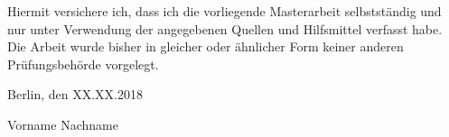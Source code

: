 
Hiermit versichere ich, dass ich die vorliegende Masterarbeit selbstständig und nur unter Verwendung der angegebenen Quellen und Hilfsmittel verfasst habe. Die Arbeit wurde bisher in gleicher oder ähnlicher Form keiner anderen Prüfungsbehörde vorgelegt.

\vskip 1cm

Berlin, den XX.XX.2018

\vskip 1.5cm

Vorname Nachname
